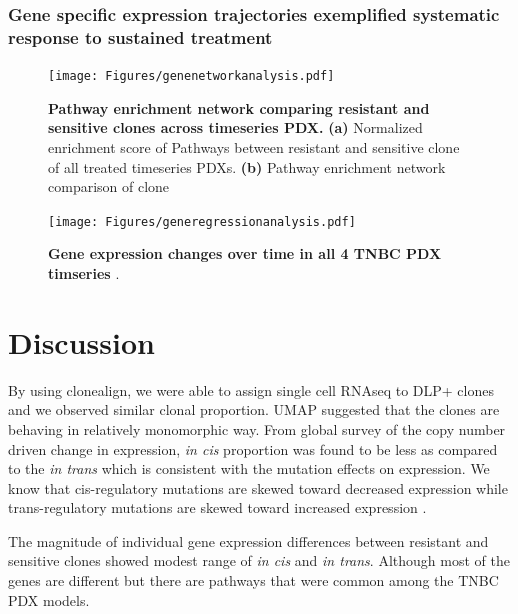 \subsubsection{Gene specific expression trajectories exemplified systematic response to sustained treatment}








\begin{figure}
\centering
  \texttt{[image: Figures/genenetworkanalysis.pdf]}
\caption[DE of resistant and sensitive clonealign defined clones]
	{\small
	\textbf{Pathway enrichment network comparing resistant and sensitive clones across timeseries PDX.}
	\textbf{(a)} Normalized enrichment score of Pathways between resistant and sensitive clone of all treated timeseries PDXs.
	    \textbf{(b)} Pathway enrichment network comparison of clone }
		\label{fig:genenetworkanalysis}
\end{figure}









\begin{figure}
\centering
 \texttt{[image: Figures/generegressionanalysis.pdf]}
	
\caption[Gene expression changes over time]
	{\small
	 \textbf{Gene expression changes over time in all 4 TNBC PDX timseries} .
	}
	\label{fig:generegressionanalysis}
\end{figure}



\section{Discussion}

By using clonealign, we were able to assign single cell RNAseq to  DLP+ clones and we observed similar clonal proportion. UMAP suggested that the clones are behaving in relatively monomorphic way. From global survey of the copy number driven change in expression, \textit{in cis} proportion was found to be less as compared to the \textit{in trans} which is consistent with the mutation effects on expression. We know that cis-regulatory mutations are skewed toward decreased expression while trans-regulatory mutations are skewed toward increased expression \cite{metzger2016contrasting}.

The magnitude of individual gene expression differences between resistant and sensitive clones showed modest range of \textit{in cis} and \textit{in trans}. Although most of the genes are different but there are pathways that were common among the TNBC PDX models. 

